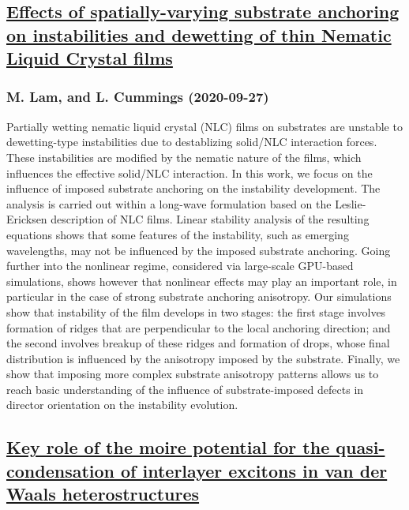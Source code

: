 \subsection*{\href{http://arxiv.org/abs/2009.12946v1}{Effects of spatially-varying substrate anchoring on instabilities and  dewetting of thin Nematic Liquid Crystal films}}
\subsubsection*{M. Lam, and L. Cummings (2020-09-27)}
Partially wetting nematic liquid crystal (NLC) films on substrates are
unstable to dewetting-type instabilities due to destablizing solid/NLC
interaction forces. These instabilities are modified by the nematic nature of
the films, which influences the effective solid/NLC interaction. In this work,
we focus on the influence of imposed substrate anchoring on the instability
development. The analysis is carried out within a long-wave formulation based
on the Leslie-Ericksen description of NLC films. Linear stability analysis of
the resulting equations shows that some features of the instability, such as
emerging wavelengths, may not be influenced by the imposed substrate anchoring.
Going further into the nonlinear regime, considered via large-scale GPU-based
simulations, shows however that nonlinear effects may play an important role,
in particular in the case of strong substrate anchoring anisotropy. Our
simulations show that instability of the film develops in two stages: the first
stage involves formation of ridges that are perpendicular to the local
anchoring direction; and the second involves breakup of these ridges and
formation of drops, whose final distribution is influenced by the anisotropy
imposed by the substrate. Finally, we show that imposing more complex substrate
anisotropy patterns allows us to reach basic understanding of the influence of
substrate-imposed defects in director orientation on the instability evolution.

\subsection*{\href{http://arxiv.org/abs/2009.12943v1}{Key role of the moire potential for the quasi-condensation of interlayer  excitons in van der Waals heterostructures}}
